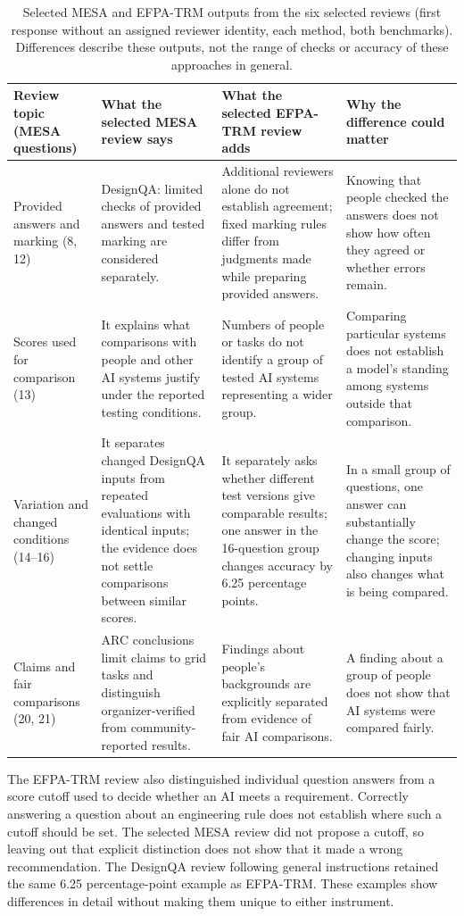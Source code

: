 \documentclass[10pt,conference]{IEEEtran}
\begin{document}
\begin{table}[t]
\caption{Selected MESA and EFPA-TRM outputs from the six selected reviews (first response without an assigned reviewer identity, each method, both benchmarks). Differences describe these outputs, not the range of checks or accuracy of these approaches in general.}
\label{tab:review-tradeoffs}
\small
\begin{tabularx}{\textwidth}{@{}p{}XXX@{}}
\toprule
Review topic (MESA questions) & What the selected MESA review says & What the selected EFPA-TRM review adds & Why the difference could matter \\
\midrule
Provided answers and marking (8, 12) & DesignQA: limited checks of provided answers and tested marking are considered separately. & Additional reviewers alone do not establish agreement; fixed marking rules differ from judgments made while preparing provided answers. & Knowing that people checked the answers does not show how often they agreed or whether errors remain. \\
Scores used for comparison (13) & It explains what comparisons with people and other AI systems justify under the reported testing conditions. & Numbers of people or tasks do not identify a group of tested AI systems representing a wider group. & Comparing particular systems does not establish a model's standing among systems outside that comparison. \\
Variation and changed conditions (14--16) & It separates changed DesignQA inputs from repeated evaluations with identical inputs; the evidence does not settle comparisons between similar scores. & It separately asks whether different test versions give comparable results; one answer in the 16-question group changes accuracy by 6.25 percentage points. & In a small group of questions, one answer can substantially change the score; changing inputs also changes what is being compared. \\
Claims and fair comparisons (20, 21) & ARC conclusions limit claims to grid tasks and distinguish organizer-verified from community-reported results. & Findings about people's backgrounds are explicitly separated from evidence of fair AI comparisons. & A finding about a group of people does not show that AI systems were compared fairly. \\
\bottomrule
\end{tabularx}
\end{table}

The EFPA-TRM review also distinguished individual question answers from a score cutoff used to decide whether an AI meets a requirement. Correctly answering a question about an engineering rule does not establish where such a cutoff should be set. The selected MESA review did not propose a cutoff, so leaving out that explicit distinction does not show that it made a wrong recommendation. The DesignQA review following general instructions retained the same 6.25 percentage-point example as EFPA-TRM. These examples show differences in detail without making them unique to either instrument.
\end{document}
